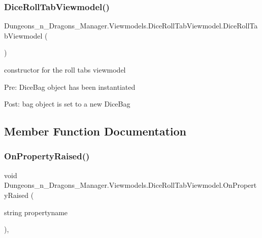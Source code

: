 \subsubsection{\texorpdfstring{Dice\+Roll\+Tab\+Viewmodel()}{DiceRollTabViewmodel()}}
{\footnotesize\ttfamily Dungeons\+\_\+n\+\_\+\+Dragons\+\_\+\+Manager.\+Viewmodels.\+Dice\+Roll\+Tab\+Viewmodel.\+Dice\+Roll\+Tab\+Viewmodel (\begin{DoxyParamCaption}{ }\end{DoxyParamCaption})\hspace{0.3cm}{\ttfamily [inline]}}



constructor for the roll tabs viewmodel 

Pre\+: Dice\+Bag object has been instantiated

Post\+: bag object is set to a new Dice\+Bag 

\subsection{Member Function Documentation}
\mbox{\label{class_dungeons__n___dragons___manager_1_1_viewmodels_1_1_dice_roll_tab_viewmodel_aed714f4bed840630e6fe4ddb4f6aa5be}} 
\subsubsection{\texorpdfstring{On\+Property\+Raised()}{OnPropertyRaised()}}
{\footnotesize\ttfamily void Dungeons\+\_\+n\+\_\+\+Dragons\+\_\+\+Manager.\+Viewmodels.\+Dice\+Roll\+Tab\+Viewmodel.\+On\+Property\+Raised (\begin{DoxyParamCaption}\item[{string}]{propertyname }\end{DoxyParamCaption})\hspace{0.3cm}{\ttfamily [inline]}, {\ttfamily [private]}}



